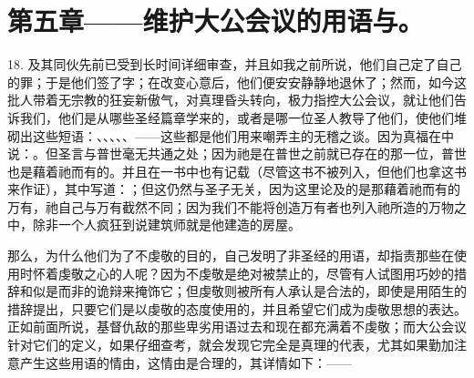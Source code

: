 
\section{第五章——维护大公会议的用语与。}

18. 及其同伙先前已受到长时间详细审查，并且如我之前所说，他们自己定了自己的罪；于是他们签了字；在改变心意后，他们便安安静静地退休了；然而，如今这批人带着无宗教的狂妄新傲气，对真理昏头转向，极力指控大公会议，就让他们告诉我们，他们是从哪些圣经篇章学来的，或者是哪一位圣人教导了他们，使他们堆砌出这些短语：、、、、、——这些都是他们用来嘲弄主的无稽之谈。因为真福在中说：。但圣言与普世毫无共通之处；因为祂是在普世之前就已存在的那一位，普世也是藉着祂而有的。并且在一书中也有记载（尽管这书不被列入，但他们也拿这书来作证），其中写道：；但这仍然与圣子无关，因为这里论及的是那藉着祂而有的万有，祂自己与万有截然不同；因为我们不能将创造万有者也列入祂所造的万物之中，除非一个人疯狂到说建筑师就是他建造的房屋。\par

那么，为什么他们为了不虔敬的目的，自己发明了非圣经的用语，却指责那些在使用时怀着虔敬之心的人呢？因为不虔敬是绝对被禁止的，尽管有人试图用巧妙的措辞和似是而非的诡辩来掩饰它；但虔敬则被所有人承认是合法的，即使是用陌生的措辞提出，只要它们是以虔敬的态度使用的，并且希望它们成为虔敬思想的表达。正如前面所说，基督仇敌的那些卑劣用语过去和现在都充满着不虔敬；而大公会议针对它们的定义，如果仔细查考，就会发现它完全是真理的代表，尤其如果勤加注意产生这些用语的情由，这情由是合理的，其详情如下：——\par

